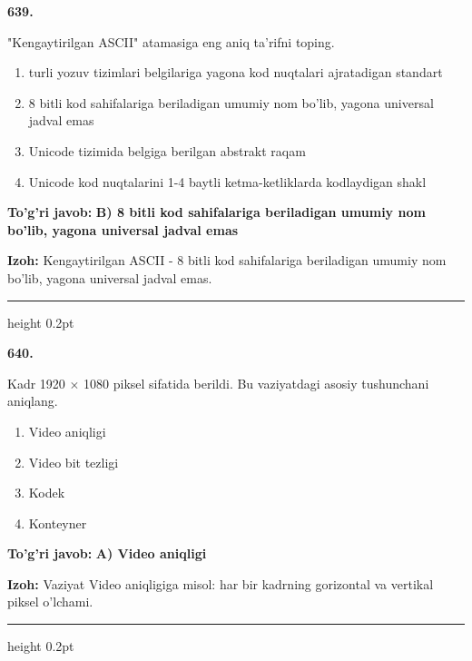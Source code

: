 \documentclass[10pt,a4paper,oneside]{article}
\begin{document}
\noindent\textbf{\color{ink}639.}
\par
"Kengaytirilgan ASCII" atamasiga eng aniq ta'rifni toping.
\begin{enumerate}[label=\Alph*),leftmargin=9mm]
\item turli yozuv tizimlari belgilariga yagona kod nuqtalari ajratadigan standart
\item 8 bitli kod sahifalariga beriladigan umumiy nom bo'lib, yagona universal jadval emas
\item Unicode tizimida belgiga berilgan abstrakt raqam
\item Unicode kod nuqtalarini 1-4 baytli ketma-ketliklarda kodlaydigan shakl
\end{enumerate}
\begin{tcolorbox}[enhanced,breakable,colback=teal!4,colframe=teal!50!black,boxrule=0.5pt,arc=1.1mm,left=3mm,right=3mm,top=1.7mm,bottom=1.7mm,before skip=2mm,after skip=2mm]
\textbf{\color{teal}To'g'ri javob:} \textbf{B) 8 bitli kod sahifalariga beriladigan umumiy nom bo'lib, yagona universal jadval emas}
\par\smallskip
\textbf{Izoh:} Kengaytirilgan ASCII - 8 bitli kod sahifalariga beriladigan umumiy nom bo'lib, yagona universal jadval emas.
\end{tcolorbox}
\vspace{2mm}\hrule height 0.2pt \vspace{3mm}

\noindent\textbf{\color{ink}640.}
\par
Kadr 1920 \ensuremath{\times} 1080 piksel sifatida berildi. Bu vaziyatdagi asosiy tushunchani aniqlang.
\begin{enumerate}[label=\Alph*),leftmargin=9mm]
\item Video aniqligi
\item Video bit tezligi
\item Kodek
\item Konteyner
\end{enumerate}
\begin{tcolorbox}[enhanced,breakable,colback=teal!4,colframe=teal!50!black,boxrule=0.5pt,arc=1.1mm,left=3mm,right=3mm,top=1.7mm,bottom=1.7mm,before skip=2mm,after skip=2mm]
\textbf{\color{teal}To'g'ri javob:} \textbf{A) Video aniqligi}
\par\smallskip
\textbf{Izoh:} Vaziyat Video aniqligiga misol: har bir kadrning gorizontal va vertikal piksel o'lchami.
\end{tcolorbox}
\vspace{2mm}\hrule height 0.2pt \vspace{3mm}
\end{document}
